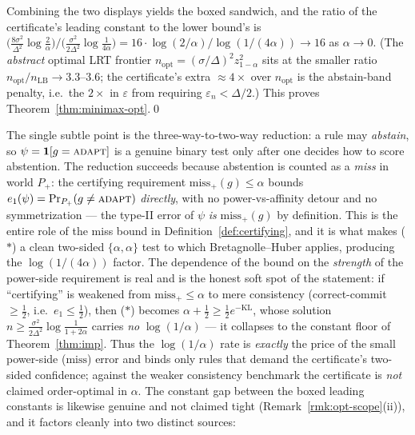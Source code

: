 \medskip
\noindent Combining the two displays yields the boxed sandwich, and the ratio of the
certificate's leading constant to the lower bound's is
$\big(\tfrac{8\sigma^2}{\Delta^2}\log\tfrac2\alpha\big)\big/\big(\tfrac{\sigma^2}{2
\Delta^2}\log\tfrac1{4\alpha}\big)=16\cdot\log(2/\alpha)/\log(1/(4\alpha))\to16$ as $\alpha\to0$.
(The \emph{abstract} optimal LRT frontier $n_{\mathrm{opt}}=(\sigma/\Delta)^2 z_{1-\alpha}^2$ sits at
the smaller ratio $n_{\mathrm{opt}}/n_{\mathrm{LB}}\to3.3$--$3.6$; the certificate's extra
$\approx4\times$ over $n_{\mathrm{opt}}$ is the abstain-band penalty, i.e.\ the $2\times$ in
$\varepsilon$ from requiring $\varepsilon_n<\Delta/2$.) This proves Theorem~\ref{thm:minimax-opt}.\qed

\begin{remark}\label{rmk:opt-delicate}
The single subtle point is the three-way-to-two-way reduction: a rule may \emph{abstain}, so
$\psi=\mathbf 1[g=\textsc{adapt}]$ is a genuine binary test only after one decides how to score
abstention. The reduction succeeds because abstention is counted as a \emph{miss} in world $P_+$:
the certifying requirement $\mathrm{miss}_+(g)\le\alpha$ bounds
$e_1(\psi)=\Pr_{P_+}(g\neq\textsc{adapt})$ \emph{directly}, with no power-vs-affinity detour and
no symmetrization --- the type-II error of $\psi$ \emph{is} $\mathrm{miss}_+(g)$ by definition.
This is the entire role of the miss bound in Definition~\ref{def:certifying}, and it is what makes
($\ast$) a clean two-sided $\{\alpha,\alpha\}$ test to which Bretagnolle--Huber applies, producing
the $\log(1/(4\alpha))$ factor. The dependence of the bound on the \emph{strength} of the
power-side requirement is real and is the honest soft spot of the statement: if ``certifying'' is
weakened from $\mathrm{miss}_+\le\alpha$ to mere consistency (correct-commit $\ge\tfrac12$, i.e.\
$e_1\le\tfrac12$), then ($\ast$) becomes $\alpha+\tfrac12\ge\tfrac12 e^{-\mathrm{KL}}$, whose
solution $n\ge\tfrac{\sigma^2}{2\Delta^2}\log\tfrac1{1+2\alpha}$ carries \emph{no}
$\log(1/\alpha)$ --- it collapses to the constant floor of Theorem~\ref{thm:imp}. Thus the
$\log(1/\alpha)$ rate is \emph{exactly} the price of the small power-side ($\mathrm{miss}$) error
and binds only rules that demand the certificate's two-sided confidence; against the weaker
consistency benchmark the certificate is \emph{not} claimed order-optimal in $\alpha$. The
constant gap between the boxed leading constants is likewise genuine and not claimed tight
(Remark~\ref{rmk:opt-scope}(ii)), and it factors cleanly into two distinct sources:

\end{remark}

